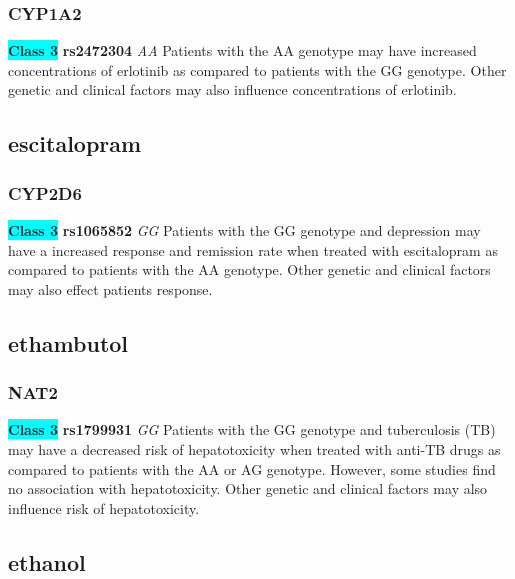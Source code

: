 \documentclass{book}
\begin{document}
\subsubsection{ CYP1A2 }

\begin{center}
\textbf{\colorbox{cyan} {Class 3}} \textbf{ rs2472304 } \textit{ AA }
Patients with the AA genotype may have increased concentrations of erlotinib as compared to patients with the GG genotype. Other genetic and clinical factors may also influence concentrations of erlotinib.


\end{center}\subsection{ escitalopram }


\subsubsection{ CYP2D6 }

\begin{center}
\textbf{\colorbox{cyan} {Class 3}} \textbf{ rs1065852 } \textit{ GG }
Patients with the GG genotype and depression may have a increased response and remission rate when treated with escitalopram as compared to patients with the AA genotype. Other genetic and clinical factors may also effect patients response.


\end{center}\subsection{ ethambutol }


\subsubsection{ NAT2 }

\begin{center}
\textbf{\colorbox{cyan} {Class 3}} \textbf{ rs1799931 } \textit{ GG }
Patients with the GG genotype and tuberculosis (TB) may have a decreased risk of hepatotoxicity when treated with anti-TB drugs as compared to patients with the AA or AG genotype. However, some studies find no association with hepatotoxicity. Other genetic and clinical factors may also influence risk of hepatotoxicity.


\end{center}\subsection{ ethanol }
\end{document}
